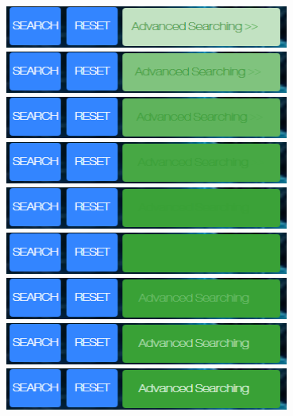\documentclass[10pt,twoside,a4paper,titlepage]{article}
\begin{document}
	\includegraphics[width=0.7\textwidth]{cyf/Advanced_searching21.png}
	\newline	
	\includegraphics[width=0.7\textwidth]{cyf/Advanced_searching22.png}
	\newline	
	\includegraphics[width=0.7\textwidth]{cyf/Advanced_searching23.png}
	\newline	
	\includegraphics[width=0.7\textwidth]{cyf/Advanced_searching24.png}
	\newline	
	\includegraphics[width=0.7\textwidth]{cyf/Advanced_searching25.png}
	\newline	
	\includegraphics[width=0.7\textwidth]{cyf/Advanced_searching26.png}
	\newline	
	\includegraphics[width=0.7\textwidth]{cyf/Advanced_searching27.png}
	\newline	
	\includegraphics[width=0.7\textwidth]{cyf/Advanced_searching28.png}
	\newline	
	\includegraphics[width=0.7\textwidth]{cyf/Advanced_searching29.png}
\end{document}
